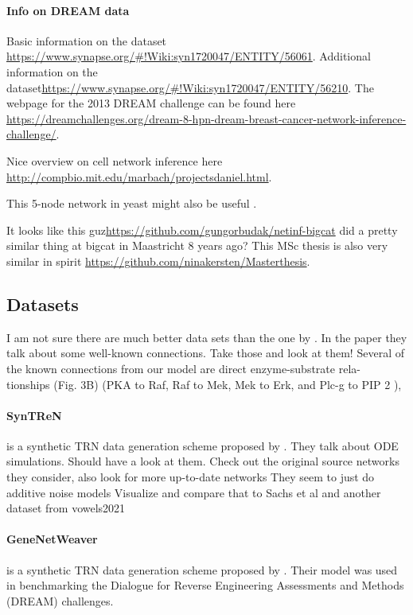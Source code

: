 \documentclass{article}
\begin{document}
\paragraph{Info on DREAM data}
Basic information on the dataset \url{https://www.synapse.org/#!Wiki:syn1720047/ENTITY/56061}. Additional information on the dataset\url{https://www.synapse.org/#!Wiki:syn1720047/ENTITY/56210}. The webpage for the 2013 DREAM challenge can be found here \url{https://dreamchallenges.org/dream-8-hpn-dream-breast-cancer-network-inference-challenge/}.

Nice overview on cell network inference here \url{http://compbio.mit.edu/marbach/projectsdaniel.html}.

This 5-node network in yeast might also be useful \cite{cantone2009yeast}.

\vspace{.5em}

It looks like this guz\url{https://github.com/gungorbudak/netinf-bigcat} did a pretty similar thing at bigcat in Maastricht 8 years ago?
This MSc thesis is also very similar in spirit \url{https://github.com/ninakersten/Masterthesis}.

\subsection{Datasets}

I am not sure there are much better data sets than the one by \cite{sachs2005causal}.
In the paper they talk about some well-known connections. Take those and look at them!
Several of the known connections from
our model are direct enzyme-substrate rela-
tionships (Fig. 3B) (PKA to Raf, Raf to Mek,
Mek to Erk, and Plc-g to PIP 2 ),

\paragraph{SynTReN}
is a synthetic TRN data generation scheme proposed by \cite{van2006syntren}. 
They talk about ODE simulations. Should have a look at them.
Check out the original source networks they consider, also look for more up-to-date networks
They seem to just do additive noise models
Visualize and compare that to Sachs et al and another dataset from vowels2021

\paragraph{GeneNetWeaver} is a synthetic TRN data generation scheme proposed by \cite{schaffter2011genenetweaver}. Their model was used in benchmarking the Dialogue for Reverse Engineering Assessments and Methods (DREAM) challenges.
\end{document}
